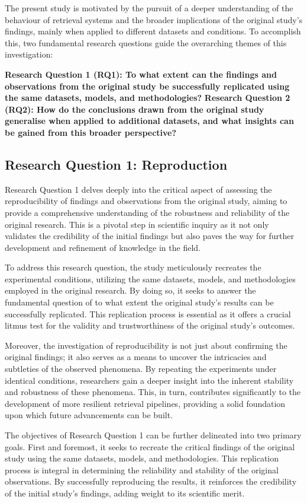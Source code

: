 The present study is motivated by the pursuit of a deeper understanding of the behaviour of retrieval systems and the broader implications of the original study's findings, mainly when applied to different datasets and conditions. To accomplish this, two fundamental research questions guide the overarching themes of this investigation:

\textbf{Research Question 1 (RQ1): To what extent can the findings and observations from the original study be successfully replicated using the same datasets, models, and methodologies?}
\textbf{Research Question 2 (RQ2): How do the conclusions drawn from the original study generalise when applied to additional datasets, and what insights can be gained from this broader perspective?} 

\subsection{Research Question 1: Reproduction}
Research Question 1 delves deeply into the critical aspect of assessing the reproducibility of findings and observations from the original study, aiming to provide a comprehensive understanding of the robustness and reliability of the original research. This is a pivotal step in scientific inquiry as it not only validates the credibility of the initial findings but also paves the way for further development and refinement of knowledge in the field.

To address this research question, the study meticulously recreates the experimental conditions, utilizing the same datasets, models, and methodologies employed in the original research. By doing so, it seeks to answer the fundamental question of to what extent the original study's results can be successfully replicated. This replication process is essential as it offers a crucial litmus test for the validity and trustworthiness of the original study's outcomes.

Moreover, the investigation of reproducibility is not just about confirming the original findings; it also serves as a means to uncover the intricacies and subtleties of the observed phenomena. By repeating the experiments under identical conditions, researchers gain a deeper insight into the inherent stability and robustness of these phenomena. This, in turn, contributes significantly to the development of more resilient retrieval pipelines, providing a solid foundation upon which future advancements can be built.

The objectives of Research Question 1 can be further delineated into two primary goals. First and foremost, it seeks to recreate the critical findings of the original study using the same datasets, models, and methodologies. This replication process is integral in determining the reliability and stability of the original observations. By successfully reproducing the results, it reinforces the credibility of the initial study's findings, adding weight to its scientific merit.

